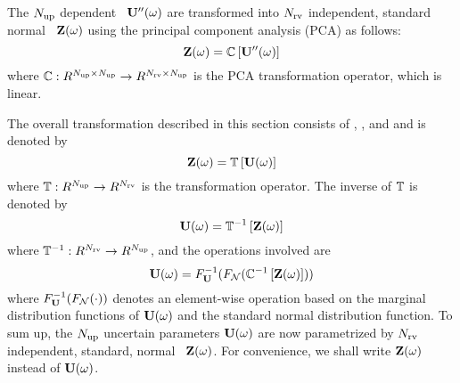 The ${N_\text{up}}$ dependent \rvs\ $\mathbf{U}''(\omega)$ are transformed into ${N_\text{rv}}$ independent, standard normal \rvs\ $\mathbf{Z}(\omega)$ using the principal component analysis (PCA) as follows:
\begin{equation} \elabel{independent-normal}
  \vZ(\o) = \oPCA{\vU''(\o)}
\end{equation}
where $\oPCA: \real^{\Nup \times \Nup} \to \real^{\Nrv \times \Nup}$ is the PCA transformation operator, which is linear.

The overall transformation described in this section consists of , , and  and is denoted by
\[
  \vZ(\o) = \oT{\vU(\o)}
\]
where $\oT: \real^\Nup \to \real^\Nrv$ is the transformation operator. The inverse of $\oT$ is denoted by
\[
  \vU(\o) = \oInvT{\vZ(\o)}
\]
where $\oInvT: \real^\Nrv \to \real^\Nup$, and the operations involved are
\[
  \vU(\o) = \CDF_{\vU}^{-1}(\CDF_\normal(\oInvPCA{\vZ(\o)}))
\]
where $F^{-1}_{\mathbf{U}}(F_{\mathcal{N}}(\cdot))$ denotes an element-wise operation based on the marginal distribution functions of $\mathbf{U}(\omega)$ and the standard normal distribution function. To sum up, the ${N_\text{up}}$ uncertain parameters $\mathbf{U}(\omega)$ are now parametrized by ${N_\text{rv}}$ independent, standard, normal \rvs\ $\mathbf{Z}(\omega)$. For convenience, we shall write $\mathbf{Z}(\omega)$ instead of $\mathbf{U}(\omega)$.
